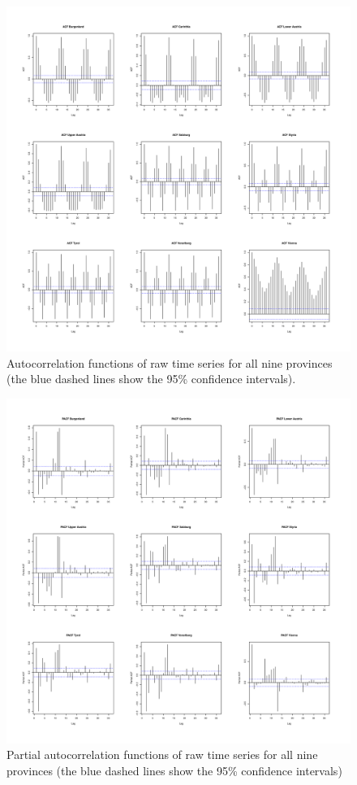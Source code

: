 \documentclass[a4paper,reqno,]{article}
\begin{document}
\begin{figure}[h!]
\begin{minipage}[b]{1\textwidth}
\centering
    \includegraphics[width=1\textwidth]{images/EA/ACF.pdf}
    \caption{ Autocorrelation functions of raw time series for all nine provinces (the blue dashed lines show the 95\% confidence intervals).}\label{fig:ACFplot}
\end{minipage}
\end{figure} 
\begin{figure}[h!]
\begin{minipage}[b]{1\textwidth}
\centering
    \includegraphics[width=1\textwidth]{images/EA/PACF.pdf}
    \caption{ Partial autocorrelation functions of raw time series for all nine provinces (the blue dashed lines show the 95\% confidence intervals) }\label{fig:PACFplot}
\end{minipage}
\end{figure} 
\end{document}
